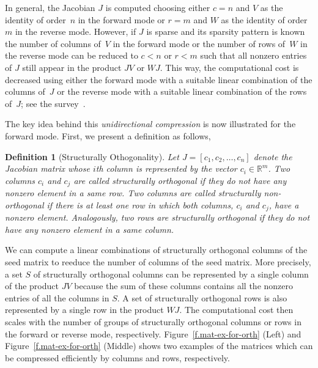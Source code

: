 \documentclass[12pt, oneside]{book}
\newtheorem{definition}{Definition}
\newcommand{\figref}[1]{Figure~\protect\ref{#1}}
\newcommand{\setR}{\ensuremath{\mathbb{R}}}
\newcommand{\col}{\ensuremath{c}}
\newcommand{\row}{\ensuremath{r}}
\begin{document}
In general, the Jacobian $J$ is computed choosing either $c=n$ and $V$ as the identity of
order~$n$ in the forward mode or $r = m$ and $W$ as the identity of order $m$ in the
reverse mode. However, if $J$ is sparse and its sparsity pattern is known the number of
columns of~$V$ in the forward mode or the number of rows of~$W$ in the reverse mode can
be reduced to $\col < n$ or $\row < m$ such that all nonzero entries of $J$ still appear
in the product $JV$ or $WJ$. This way, the computational cost is decreased using either
the forward mode with a suitable linear combination of the columns of~$J$ or the reverse
mode with a suitable linear combination of the rows of~$J$; see the
survey~\cite{Gebremedhin05whatcolor}.

The key idea behind this \emph{unidirectional compression} is now illustrated for the
forward mode. First, we present a definition as follows, 
\begin{definition}[Structurally Othogonality]
\label{d:struct_orth}
Let $J=[c_1, c_2, \dots, c_n]$ denote the Jacobian matrix whose $i$th
column is represented by the vector $c_i \in \setR^m$. Two columns $c_i$ and $c_j$ are
called \emph{structurally orthogonal} if they do not have any nonzero element in a same
row. Two columns are called \emph{structurally non-orthogonal} if there is at least one
row in which both columns, $c_i$ and $c_j$, have a nonzero element.
Analogously, two rows are
\emph{structurally orthogonal} if they do not have any nonzero element in a same column.
\end{definition}
We can compute a linear combinations of structurally orthogonal columns of the seed matrix
to reeduce the number of columns of the seed matrix.
More precisely, a set $S$ of structurally orthogonal columns can be
represented by a single column of the product $JV$ because the sum of these columns
contains all the nonzero entries of all the columns in $S$. 
A set of structurally orthogonal rows is also represented by a single row in the product $WJ$.
The computational cost then scales with the number of groups of structurally orthogonal
columns or rows in the forward or reverse mode, respectively. 
\figref{f.mat-ex-for-orth} (Left) and \figref{f.mat-ex-for-orth} (Middle) shows two examples
of the matrices which can be compressed efficiently by columns and rows, respectively.
\end{document}
